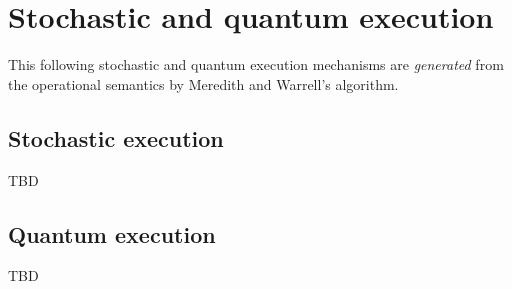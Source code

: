 \section{Stochastic and quantum execution}

This following stochastic and quantum execution mechanisms are
\emph{generated} from the operational semantics by Meredith and
Warrell's algorithm.

\subsection{Stochastic execution}

TBD

\subsection{Quantum execution}

TBD
